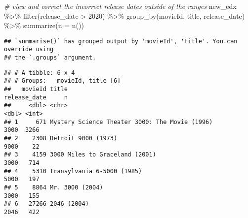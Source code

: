 \documentclass[
]{article}
\newenvironment{Shaded}{\begin{snugshade}}{\end{snugshade}}
\newcommand{\AttributeTok}[1]{\textcolor[rgb]{0.77,0.63,0.00}{#1}}
\newcommand{\CommentTok}[1]{\textcolor[rgb]{0.56,0.35,0.01}{\textit{#1}}}
\newcommand{\DecValTok}[1]{\textcolor[rgb]{0.00,0.00,0.81}{#1}}
\newcommand{\FunctionTok}[1]{\textcolor[rgb]{0.00,0.00,0.00}{#1}}
\newcommand{\NormalTok}[1]{#1}
\newcommand{\SpecialCharTok}[1]{\textcolor[rgb]{0.00,0.00,0.00}{#1}}
\begin{document}
\begin{Shaded}
\begin{Highlighting}[]
\CommentTok{\# view and correct the incorrect release dates outside of the ranges}
\NormalTok{new\_edx }\SpecialCharTok{\%\textgreater{}\%} \FunctionTok{filter}\NormalTok{(release\_date }\SpecialCharTok{\textgreater{}} \DecValTok{2020}\NormalTok{) }\SpecialCharTok{\%\textgreater{}\%} \FunctionTok{group\_by}\NormalTok{(movieId, title, release\_date) }\SpecialCharTok{\%\textgreater{}\%} \FunctionTok{summarize}\NormalTok{(}\AttributeTok{n =} \FunctionTok{n}\NormalTok{())}
\end{Highlighting}
\end{Shaded}

\begin{verbatim}
## `summarise()` has grouped output by 'movieId', 'title'. You can override using
## the `.groups` argument.
\end{verbatim}

\begin{verbatim}
## # A tibble: 6 x 4
## # Groups:   movieId, title [6]
##   movieId title                                          release_date     n
##     <dbl> <chr>                                                 <dbl> <int>
## 1     671 Mystery Science Theater 3000: The Movie (1996)         3000  3266
## 2    2308 Detroit 9000 (1973)                                    9000    22
## 3    4159 3000 Miles to Graceland (2001)                         3000   714
## 4    5310 Transylvania 6-5000 (1985)                             5000   197
## 5    8864 Mr. 3000 (2004)                                        3000   155
## 6   27266 2046 (2004)                                            2046   422
\end{verbatim}
\end{document}
